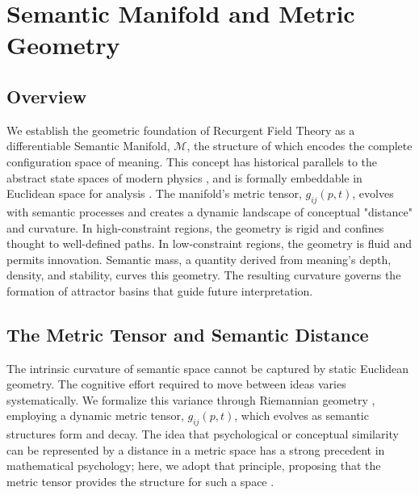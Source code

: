 \chapter{Semantic Manifold and Metric Geometry}
\label{ch:semantic_manifold_and_metric_geometry}


\section{Overview}

We establish the geometric foundation of Recurgent Field Theory as a differentiable Semantic Manifold, \(\mathcal{M}\), the structure of which encodes the complete configuration space of meaning. This concept has historical parallels to the abstract state spaces of modern physics \autocite{vonNeumann1932}, and is formally embeddable in Euclidean space for analysis \autocite{Whitney1936}. The manifold's metric tensor, \(g_{ij}(p, t)\), evolves with semantic processes and creates a dynamic landscape of conceptual "distance" and curvature. In high-constraint regions, the geometry is rigid and confines thought to well-defined paths. In low-constraint regions, the geometry is fluid and permits innovation. Semantic mass, a quantity derived from meaning's depth, density, and stability, curves this geometry. The resulting curvature governs the formation of attractor basins that guide future interpretation.


\section{The Metric Tensor and Semantic Distance}
\label{sec:the_metric_tensor_and_semantic_distance}

The intrinsic curvature of semantic space cannot be captured by static Euclidean geometry. The cognitive effort required to move between ideas varies systematically. We formalize this variance through Riemannian geometry \autocite{Riemann1868, doCarmo1992}, employing a dynamic metric tensor, \(g_{ij}(p,t)\), which evolves as semantic structures form and decay. The idea that psychological or conceptual similarity can be represented by a distance in a metric space has a strong precedent in mathematical psychology; here, we adopt that principle, proposing that the metric tensor provides the structure for such a space \autocite{Shepard1987}.

